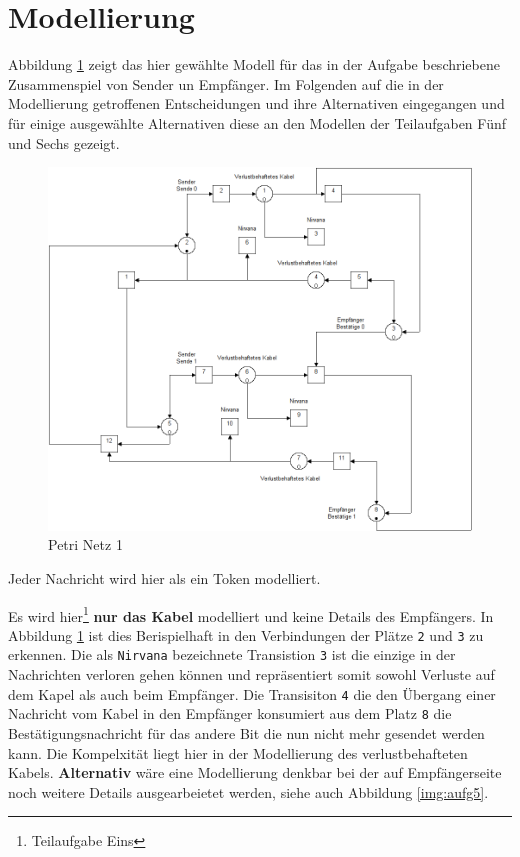 \documentclass[10pt]{scrartcl}
\author{André Harms, Oliver Steenbuck}
\title{\titletext}
\date{04.04.2012}
\begin{document}
\maketitle

\setcounter{tocdepth}{3}
\tableofcontents

	\listoftables                                 												%
	\listoffigures   

\section{Modellierung}
	Abbildung \ref{img:aufg1} zeigt das hier gewählte Modell für das in der Aufgabe beschriebene Zusammenspiel von Sender un Empfänger. Im Folgenden auf die in der Modellierung getroffenen Entscheidungen und ihre Alternativen eingegangen und für einige ausgewählte Alternativen diese an den Modellen der Teilaufgaben Fünf und Sechs gezeigt.
	  
	\begin{figure}[H]
                \includegraphics[scale=0.5]{praktikum1-aufgabe1.png}
        \caption{Petri Netz 1}
        \label{img:aufg1}
	\end{figure}
	
Jeder Nachricht wird hier als ein Token modelliert.
	
Es wird hier\footnote{Teilaufgabe Eins} \textbf{nur das Kabel} modelliert und keine Details des Empfängers. In Abbildung \ref{img:aufg1} ist dies Berispielhaft in den Verbindungen der Plätze \verb!2! und \verb!3! zu erkennen. Die als \verb!Nirvana! bezeichnete Transistion \verb!3! ist die einzige in der Nachrichten verloren gehen können und repräsentiert somit sowohl Verluste auf dem Kapel als auch beim Empfänger. Die Transisiton \verb!4! die den Übergang einer Nachricht vom Kabel in den Empfänger konsumiert aus dem Platz \verb!8! die Bestätigungsnachricht für das andere Bit die nun nicht mehr gesendet werden kann.
Die Kompelxität liegt hier in der Modellierung des verlustbehafteten Kabels. \textbf{Alternativ} wäre eine Modellierung denkbar bei der auf Empfängerseite noch weitere Details ausgearbeietet werden, siehe auch Abbildung \ref{img:aufg5}.
\end{document}
